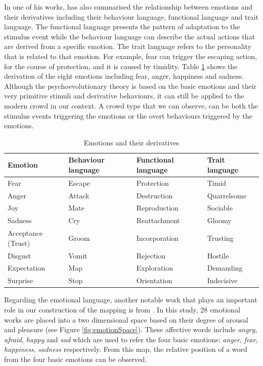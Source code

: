 In one of his works, \citet{plutchik2001integration} has also summarised the relationship between emotions and their derivatives including their behaviour language, functional language and trait language. The functional language presents the pattern of adaptation to the stimulus event while the behaviour language can describe the actual actions that are derived from a specific emotion. The trait language refers to the personality that is related to that emotion. For example, fear can trigger the escaping action, for the course of protection, and it is caused by timidity. Table \ref{table:derivationOfEmotion} shows the derivation of the eight emotions including fear, anger, happiness and sadness. Although the psychoevolutionary theory is based on the basic emotions and their very primitive stimuli and derivative behaviours, it can still be applied to the modern crowd in our context. A crowd type that we can observe, can be both the stimulus events triggering the emotions or the overt behaviours triggered by the emotions. 

\begin{table}
\caption{Emotions and their derivatives}
\label{table:derivationOfEmotion}
\centering
\begin{tabular}{|p{3cm}|p{3cm}|p{3cm}|p{3cm}|}
\hline
\textbf{Emotion} & \textbf{Behaviour language} & \textbf{Functional language} & \textbf{Trait language} \\
\hline
Fear & Escape & Protection & Timid \\
\hline
Anger & Attack & Destruction & Quarrelsome \\
\hline
Joy & Mate & Reproduction & Sociable \\
\hline
Sadness & Cry & Reattachment & Gloomy \\
\hline
Acceptance (Trust) & Groom & Incorporation & Trusting \\
\hline
Disgust & Vomit & Rejection & Hostile \\
\hline
Expectation & Map & Exploration & Demanding \\
\hline
Surprise & Stop & Orientation & Indecisive \\
\hline
\end{tabular}
\end{table}

Regarding the emotional language, another notable work that plays an important role in our construction of the mapping is from \citet{russell1980circumplex}. In this study, 28 emotional works are placed into a two dimensional space based on their degree of arousal and pleasure (see Figure \ref{fig:emotionSpace}). These affective words include \textit{angry}, \textit{afraid}, \textit{happy} and \textit{sad} which are used to refer the four basic emotions: \textit{anger}, \textit{fear}, \textit{happiness}, \textit{sadness} respectively. From this map, the relative position of a word from the four basic emotions can be observed.

